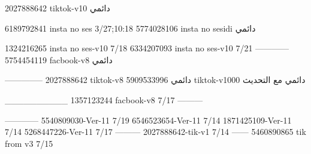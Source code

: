 2027888642 tiktok-v10
دائمي

6189792841 insta no ses
3/27;10:18
5774028106 insta no sesidi
دائمي

1324216265 insta no ses-v10
7/18
6334207093 insta no ses-v10
7/21
------------
5754454119 facbook-v8
دائمي


--------------
2027888642 tiktok-v8
دائمي
5909533996 tiktok-v1000
دائمي مع التحديث

__________
1357123244 facbook-v8
7/17
---------

------------
5540809030-Ver-11
7/19
6546523654-Ver-11
7/14
1871425109-Ver-11
7/14
5268447226-Ver-11
7/17
---------
2027888642-tik-v1
7/14
------
5460890865 tik from v3
7/15
